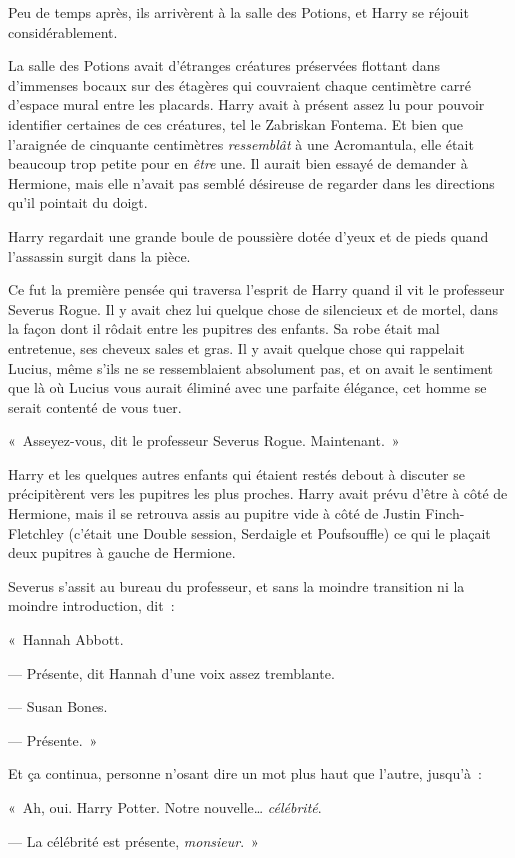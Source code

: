 Peu de temps après, ils arrivèrent à la salle des Potions, et Harry se réjouit considérablement.

La salle des Potions avait d'étranges créatures préservées flottant dans d'immenses bocaux sur des étagères qui couvraient chaque centimètre carré d'espace mural entre les placards. Harry avait à présent assez lu pour pouvoir identifier certaines de ces créatures, tel le Zabriskan Fontema. Et bien que l'araignée de cinquante centimètres \emph{ressemblât} à une Acromantula, elle était beaucoup trop petite pour en \emph{être} une. Il aurait bien essayé de demander à Hermione, mais elle n'avait pas semblé désireuse de regarder dans les directions qu'il pointait du doigt.

Harry regardait une grande boule de poussière dotée d'yeux et de pieds quand l'assassin surgit dans la pièce.

Ce fut la première pensée qui traversa l'esprit de Harry quand il vit le professeur Severus Rogue. Il y avait chez lui quelque chose de silencieux et de mortel, dans la façon dont il rôdait entre les pupitres des enfants. Sa robe était mal entretenue, ses cheveux sales et gras. Il y avait quelque chose qui rappelait Lucius, même s'ils ne se ressemblaient absolument pas, et on avait le sentiment que là où Lucius vous aurait éliminé avec une parfaite élégance, cet homme se serait contenté de vous tuer.

«~Asseyez-vous, dit le professeur Severus Rogue. Maintenant.~»

Harry et les quelques autres enfants qui étaient restés debout à discuter se précipitèrent vers les pupitres les plus proches. Harry avait prévu d'être à côté de Hermione, mais il se retrouva assis au pupitre vide à côté de Justin Finch-Fletchley (c'était une Double session, Serdaigle et Poufsouffle) ce qui le plaçait deux pupitres à gauche de Hermione.

Severus s'assit au bureau du professeur, et sans la moindre transition ni la moindre introduction, dit~:

«~Hannah Abbott.

--- Présente, dit Hannah d'une voix assez tremblante.

--- Susan Bones.

--- Présente.~»

Et ça continua, personne n'osant dire un mot plus haut que l'autre, jusqu'à~:

«~Ah, oui. Harry Potter. Notre nouvelle… \emph{célébrité}.

--- La célébrité est présente, \emph{monsieur}.~»

